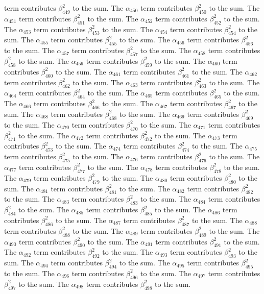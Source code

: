 \begin{lemma}
term contributes $\beta_{449}^{2}$ to the sum. The $\alpha_{450}$ term contributes $\beta_{450}^{2}$ to the sum. The $\alpha_{451}$ term contributes $\beta_{451}^{2}$ to the sum. The $\alpha_{452}$ term contributes $\beta_{452}^{2}$ to the sum. The $\alpha_{453}$ term contributes $\beta_{453}^{2}$ to the sum. The $\alpha_{454}$ term contributes $\beta_{454}^{2}$ to the sum. The $\alpha_{455}$ term contributes $\beta_{455}^{2}$ to the sum. The $\alpha_{456}$ term contributes $\beta_{456}^{2}$ to the sum. The $\alpha_{457}$ term contributes $\beta_{457}^{2}$ to the sum. The $\alpha_{458}$ term contributes $\beta_{458}^{2}$ to the sum. The $\alpha_{459}$ term contributes $\beta_{459}^{2}$ to the sum. The $\alpha_{460}$ term contributes $\beta_{460}^{2}$ to the sum. The $\alpha_{461}$ term contributes $\beta_{461}^{2}$ to the sum. The $\alpha_{462}$ term contributes $\beta_{462}^{2}$ to the sum. The $\alpha_{463}$ term contributes $\beta_{463}^{2}$ to the sum. The $\alpha_{464}$ term contributes $\beta_{464}^{2}$ to the sum. The $\alpha_{465}$ term contributes $\beta_{465}^{2}$ to the sum. The $\alpha_{466}$ term contributes $\beta_{466}^{2}$ to the sum. The $\alpha_{467}$ term contributes $\beta_{467}^{2}$ to the sum. The $\alpha_{468}$ term contributes $\beta_{468}^{2}$ to the sum. The $\alpha_{469}$ term contributes $\beta_{469}^{2}$ to the sum. The $\alpha_{470}$ term contributes $\beta_{470}^{2}$ to the sum. The $\alpha_{471}$ term contributes $\beta_{471}^{2}$ to the sum. The $\alpha_{472}$ term contributes $\beta_{472}^{2}$ to the sum. The $\alpha_{473}$ term contributes $\beta_{473}^{2}$ to the sum. The $\alpha_{474}$ term contributes $\beta_{474}^{2}$ to the sum. The $\alpha_{475}$ term contributes $\beta_{475}^{2}$ to the sum. The $\alpha_{476}$ term contributes $\beta_{476}^{2}$ to the sum. The $\alpha_{477}$ term contributes $\beta_{477}^{2}$ to the sum. The $\alpha_{478}$ term contributes $\beta_{478}^{2}$ to the sum. The $\alpha_{479}$ term contributes $\beta_{479}^{2}$ to the sum. The $\alpha_{480}$ term contributes $\beta_{480}^{2}$ to the sum. The $\alpha_{481}$ term contributes $\beta_{481}^{2}$ to the sum. The $\alpha_{482}$ term contributes $\beta_{482}^{2}$ to the sum. The $\alpha_{483}$ term contributes $\beta_{483}^{2}$ to the sum. The $\alpha_{484}$ term contributes $\beta_{484}^{2}$ to the sum. The $\alpha_{485}$ term contributes $\beta_{485}^{2}$ to the sum. The $\alpha_{486}$ term contributes $\beta_{486}^{2}$ to the sum. The $\alpha_{487}$ term contributes $\beta_{487}^{2}$ to the sum. The $\alpha_{488}$ term contributes $\beta_{488}^{2}$ to the sum. The $\alpha_{489}$ term contributes $\beta_{489}^{2}$ to the sum. The $\alpha_{490}$ term contributes $\beta_{490}^{2}$ to the sum. The $\alpha_{491}$ term contributes $\beta_{491}^{2}$ to the sum. The $\alpha_{492}$ term contributes $\beta_{492}^{2}$ to the sum. The $\alpha_{493}$ term contributes $\beta_{493}^{2}$ to the sum. The $\alpha_{494}$ term contributes $\beta_{494}^{2}$ to the sum. The $\alpha_{495}$ term contributes $\beta_{495}^{2}$ to the sum. The $\alpha_{496}$ term contributes $\beta_{496}^{2}$ to the sum. The $\alpha_{497}$ term contributes $\beta_{497}^{2}$ to the sum. The $\alpha_{498}$ term contributes $\beta_{498}^{2}$ to the sum. 
\end{lemma}
